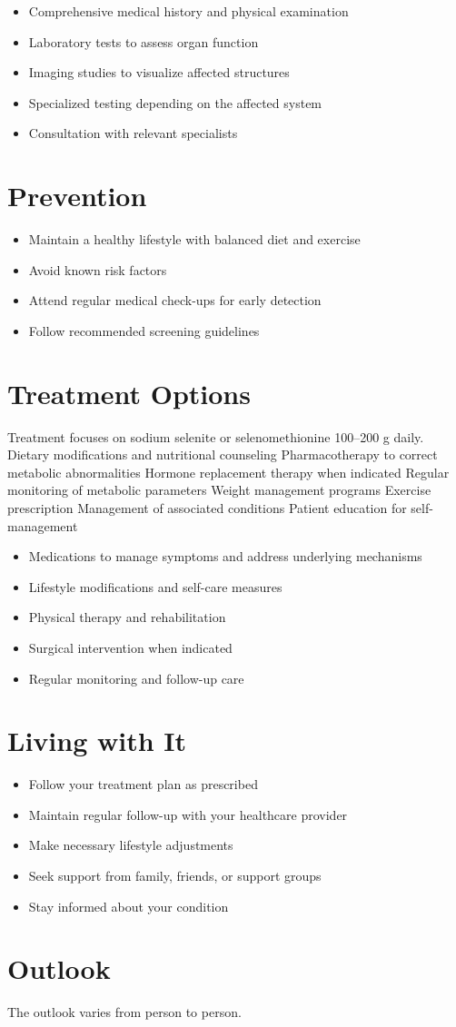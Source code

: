 \begin{itemize}[noitemsep]
  \item Comprehensive medical history and physical examination
  \item Laboratory tests to assess organ function
  \item Imaging studies to visualize affected structures
  \item Specialized testing depending on the affected system
  \item Consultation with relevant specialists
\end{itemize}
\section{Prevention}
\begin{itemize}[noitemsep]
  \item Maintain a healthy lifestyle with balanced diet and exercise
  \item Avoid known risk factors
  \item Attend regular medical check-ups for early detection
  \item Follow recommended screening guidelines
\end{itemize}
\section{Treatment Options}
Treatment focuses on sodium selenite or selenomethionine 100--200 \textmu g daily. Dietary modifications and nutritional counseling Pharmacotherapy to correct metabolic abnormalities Hormone replacement therapy when indicated Regular monitoring of metabolic parameters Weight management programs Exercise prescription Management of associated conditions Patient education for self-management

\begin{itemize}[noitemsep]
  \item Medications to manage symptoms and address underlying mechanisms
  \item Lifestyle modifications and self-care measures
  \item Physical therapy and rehabilitation
  \item Surgical intervention when indicated
  \item Regular monitoring and follow-up care
\end{itemize}
\section{Living with It}
\begin{itemize}[noitemsep]
  \item Follow your treatment plan as prescribed
  \item Maintain regular follow-up with your healthcare provider
  \item Make necessary lifestyle adjustments
  \item Seek support from family, friends, or support groups
  \item Stay informed about your condition
\end{itemize}
\section{Outlook}
The outlook varies from person to person.
